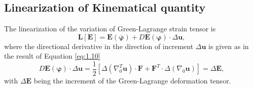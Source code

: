 \subsection{\textbf{Linearization of Kinematical quantity}}
The linearization of the variation of Green-Lagrange strain tensor is 
\begin{equation}
\mathbf{L}\left[ \mathbf{E} \right] = \mathbf{E}(\overline{\bm{\varphi}}) + D \mathbf{E}(\bm{\varphi}) \cdot \Delta \mathbf{u},
\label{eq:1.17}
\end{equation}
where the directional derivative in the direction of increment $\Delta \mathbf{u}$ is given as in the result of Equation \eqref{eq:1.10}
\begin{equation}
D \mathbf{E}(\bm{\varphi}) \cdot \Delta\mathbf{u} = \dfrac{1}{2} \left[ \Delta(\nabla_0^T \mathbf{u}) \cdot \mathbf{F} + \mathbf{F}^T \cdot \Delta(\nabla_0 \mathbf{u}) \right] = \Delta \mathbf{E},
\label{eq:1.18}
\end{equation}
with $\Delta\mathbf{E}$ being the increment of the Green-Lagrange deformation tensor.
